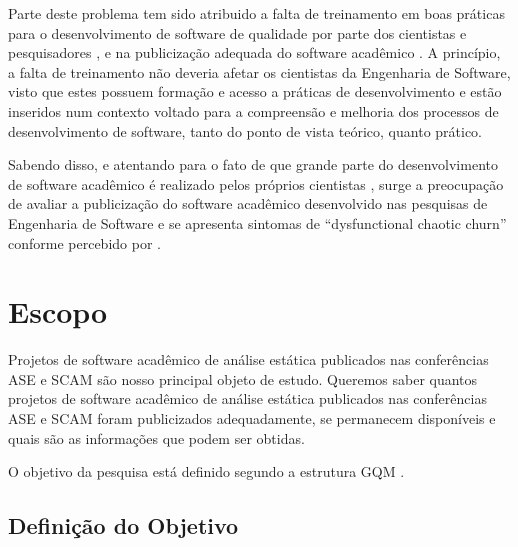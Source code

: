 Parte deste problema tem sido atribuido a falta de treinamento em boas práticas
para o desenvolvimento de software de qualidade por parte dos cientistas e pesquisadores
\cite{wilson2017good}, 
e na publicização adequada do software acadêmico \cite{allen2017engineering}.
A princípio, a falta de treinamento não deveria afetar os cientistas da
Engenharia de Software, visto que estes possuem formação e acesso a práticas de
desenvolvimento e estão inseridos num contexto voltado para a compreensão e
melhoria dos processos de desenvolvimento de software, tanto do ponto de vista
teórico, quanto prático.

Sabendo disso, e atentando para o fato de que grande parte do desenvolvimento
de software acadêmico é realizado pelos próprios cientistas
\cite{hettrick2014uk, momcheva2015software}, surge a preocupação de avaliar 
a publicização do software acadêmico desenvolvido nas pesquisas de Engenharia de
Software e se apresenta sintomas de ``dysfunctional chaotic churn'' conforme
percebido por .


\section{Escopo} \label{estudo1:escopo} %

Projetos de software acadêmico de análise estática publicados nas 
conferências ASE e SCAM 
são nosso principal objeto de estudo.
Queremos saber quantos projetos de software acadêmico de análise estática publicados
nas conferências ASE e SCAM foram publicizados adequadamente, se permanecem disponíveis e 
quais são as informações que podem ser obtidas.

O objetivo da pesquisa está definido segundo a estrutura GQM \cite{basili1994goal}.

\subsection{Definição do Objetivo}

